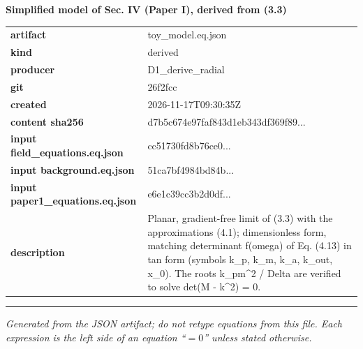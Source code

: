 \documentclass[10pt,a4paper]{article}
\begin{document}
{\Large\bfseries Simplified model of Sec. IV (Paper I), derived from (3.3)}\par
\smallskip
\begin{tabular}{@{}lp{}@{}}\textbf{artifact} & toy\_model.eq.json\\\textbf{kind} & derived\\\textbf{producer} & D1\_derive\_radial\\\textbf{git} & 26f2fcc\\\textbf{created} & 2026-11-17T09:30:35Z\\\textbf{content sha256} & d7b5c674e97faf843d1eb343df369f89...\\\textbf{input field\_equations.eq.json} & cc51730fd8b76ce0...\\\textbf{input background.eq.json} & 51ca7bf4984bd84b...\\\textbf{input paper1\_equations.eq.json} & e6e1c39cc3b2d0df...\\\textbf{description} & Planar, gradient-free limit of (3.3) with the approximations (4.1); dimensionless form, matching determinant f(omega) of Eq. (4.13) in tan form (symbols k\_p, k\_m, k\_a, k\_out, x\_0). The roots k\_pm\textasciicircum{}2 / Delta are verified to solve det(M - k\textasciicircum{}2) = 0.\\\end{tabular}
\par\medskip\hrule\medskip

\textit{Generated from the JSON artifact; do not retype equations from this file. Each expression is the left side of an equation ``$= 0$'' unless stated otherwise.}\par
\end{document}
